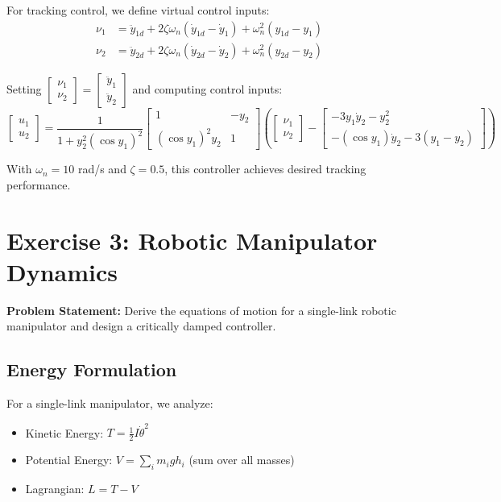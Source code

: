 \documentclass{article}
\begin{document}
For tracking control, we define virtual control inputs:
\begin{align}
\nu_1 &= \ddot{y}_{1d} + 2\zeta\omega_n (\dot{y}_{1d} - \dot{y}_1) + \omega_n^2 (y_{1d} - y_1) \\
\nu_2 &= \ddot{y}_{2d} + 2\zeta\omega_n (\dot{y}_{2d} - \dot{y}_2) + \omega_n^2 (y_{2d} - y_2)
\end{align}

Setting $\begin{bmatrix} \nu_1 \\ \nu_2 \end{bmatrix} = \begin{bmatrix} \ddot{y}_1 \\ \ddot{y}_2 \end{bmatrix}$ and computing control inputs:
\[
\begin{bmatrix} u_1 \\ u_2 \end{bmatrix} = \frac{1}{1 + y_2^2 (\cos y_1)^2} \begin{bmatrix} 1 & -y_2 \\ (\cos y_1)^2 y_2 & 1 \end{bmatrix} \left( \begin{bmatrix} \nu_1 \\ \nu_2 \end{bmatrix} - \begin{bmatrix} -3y_1\dot{y}_2 - y_2^2 \\ -(\cos y_1)\dot{y}_2 - 3(y_1 - y_2) \end{bmatrix} \right)
\]

With $\omega_n = 10$ rad/s and $\zeta = 0.5$, this controller achieves desired tracking performance.

\section{Exercise 3: Robotic Manipulator Dynamics}

\textbf{Problem Statement:} Derive the equations of motion for a single-link robotic manipulator and design a critically damped controller.

\subsection*{Energy Formulation}

For a single-link manipulator, we analyze:
\begin{itemize}[noitemsep]
    \item Kinetic Energy: $T = \frac{1}{2}I\dot{\theta}^2$ 
    \item Potential Energy: $V = \sum_{i} m_i g h_i$ (sum over all masses)
    \item Lagrangian: $L = T - V$
\end{itemize}
\end{document}
